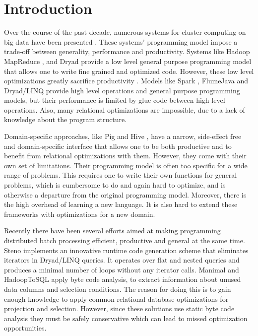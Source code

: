 \section{Introduction}
\label{sec:introduction}

Over the course of the past decade, numerous systems for cluster computing on big data have been
presented \cite{dean_mapreduce:_2008, yu_dryadlinq:_2008-1, olston_pig_2008-1,
thusoo_hive_2010-1, spark-nsdi}. These systems' programming model impose a
trade-off between generality, performance and productivity. Systems like Hadoop
MapReduce \cite{hadoop}, and Dryad \cite{isard_dryad:_2007} provide a low level
general purpose programming model that allows one to write fine grained and optimized
code. However, these low level optimizations greatly sacrifice productivity
\cite{chambers_flumejava:_2010}. Models like Spark \cite{spark-nsdi}, FlumeJava
\cite{chambers_flumejava:_2010} and Dryad/LINQ \cite{yu_dryadlinq:_2008-1}
provide high level operations and general purpose programming models, but their
performance is limited by glue code between high level operations. Also, many
relational optimizations are impossible, due to a lack of knowledge about the
program structure.

Domain-specific approaches, like Pig \cite{olston_pig_2008-1} and Hive
\cite{thusoo_hive_2010-1}, have a narrow, side-effect free and
domain-specific interface that allows one to be both productive and to benefit from relational optimizations with them.
However, they come with their own set of limitations. Their programming model is
often too specific for a wide range of problems. 
This requires one to write their own functions for general problems, which is cumbersome to do and again hard to optimize, and is otherwise a departure from the original programming model.
Moreover, there is the high overhead of
learning a new language.
It is also hard to extend these frameworks with optimizations for a new domain.

Recently there have been several efforts aimed at making programming
distributed batch processing efficient, productive and general at the same time.
Steno \cite{murray_steno:_2011} implements an innovative runtime code generation
scheme that eliminates iterators in Dryad/LINQ queries. It operates over flat
and nested queries and produces a minimal number of loops without any iterator
calls. Manimal \cite{jahani_automatic_2011} and HadoopToSQL
\cite{iu_hadooptosql:_2010} apply byte code analysis, to extract information
about unused data columns and selection conditions. The reason for doing this is to gain enough
knowledge to apply common relational database optimizations for projection and
selection. However, since these solutions use static byte code analysis they
must be safely conservative which can lead to missed optimization opportunities.

